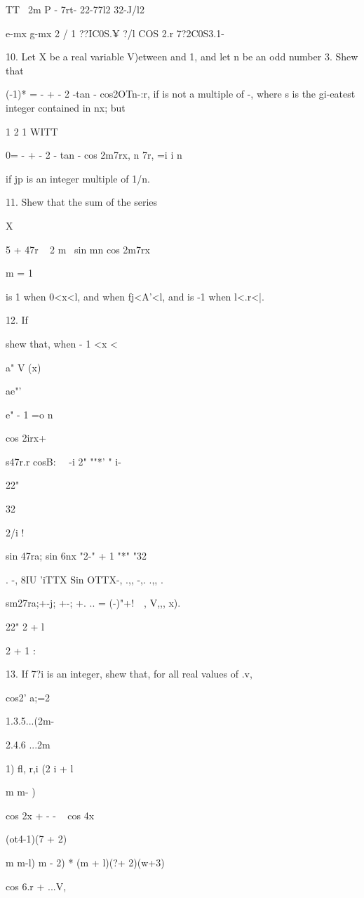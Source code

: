 TT \ 2m P - 7rt- 22-77l2 32-J/l2

e-mx g-mx 2 / 1 ??IC0S.¥ ?/l COS 2.r 7?2C0S3.1- \

10. Let X be a real variable V)etween and 1, and let n be an odd
number 3. Shew that

(-1)* = - + - 2 -tan - cos2OTn-:r, if is not a multiple of -, where s
is the gi-eatest integer contained in nx; but

 1 2 1 WITT

0= - + - 2 - tan - cos 2m7rx, n 7r, =i i n

if jp is an integer multiple of 1/n. 

11. Shew that the sum of the series

X

 5 + 47r ~ 2 m~ sin mn cos 2m7rx

m = 1

is 1 when 0<x<l, and when fj<A'<l, and is -1 when l<.r<|.

12. If

shew that, when - 1 <x <\,

a" V (x)

ae"'

e" - 1 =o n

cos 2irx+

s47r.r cosB\pij: \ \ -i 2" ""*' " i-

22"

32

2/i !

sin 47ra; sin 6nx "2-" + 1 "*" "32

. -, 8IU 'iTTX Sin OTTX-, .,, -,. .,, .

sm27ra;+-j; +-; +. .. = (-)"+! \ \,, V,,, x).

22" 2 + l

2 + 1 :


13. If 7?i is an integer, shew that, for all real values of .v,

cos2' a;=2

1.3.5...(2m-

2.4.6 ...2m

1) fl, r,i (2 i + l

m m- )

cos 2x + - - ~ cos 4x

(ot4-1)(7 + 2)

m m-l) m - 2) * (m + l)(?\pi + 2)(w+3)

cos 6.r + ...V,

